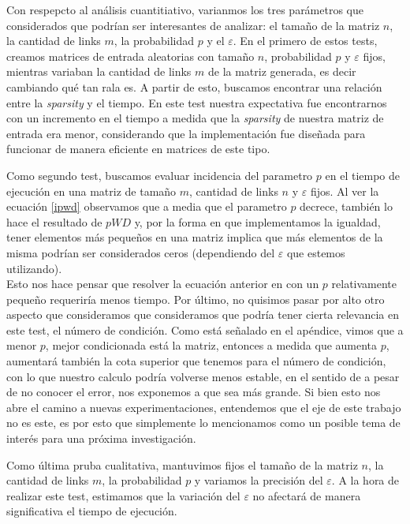 \par 

Con respepcto al an\'alisis cuantitiativo, varianmos los tres par\'ametros que considerados que podr\'ian ser interesantes de analizar:
el tama\~no de la matriz $n$, la cantidad de links $m$, la probabilidad $p$ y el $\varepsilon$.
\newline
En el primero de estos tests, creamos matrices de entrada aleatorias con tamaño $n$, probabilidad $p$ y $\varepsilon$ fijos, mientras variaban la cantidad de links $m$
de la matriz generada, es decir cambiando qu\'e tan rala es. A partir de esto, buscamos encontrar una relaci\'on entre la \textit{sparsity} y el tiempo.\newline
En este test nuestra expectativa fue encontrarnos con un incremento en el tiempo a medida 
que la \textit{sparsity} de nuestra matriz de entrada era menor, considerando que la
implementaci\'on fue diseñada para funcionar de manera eficiente en matrices de este tipo.

\par
Como segundo test, buscamos evaluar incidencia del parametro $p$ en el tiempo de ejecuci\'on en una matriz de tamaño $m$, cantidad de links $n$ 
y $\varepsilon$ fijos.\newline
Al ver la ecuaci\'on \ref{ipwd} observamos que a media que el parametro $p$ decrece, tambi\'en lo hace el resultado de $pWD$ y, 
por la forma en que implementamos la igualdad, tener elementos m\'as pequeños en una matriz implica que m\'as elementos de la misma podr\'ian 
ser considerados ceros (dependiendo del $\varepsilon$ que estemos utilizando).\\
Esto nos hace pensar que resolver la ecuaci\'on anterior en con un $p$ relativamente pequeño  requerir\'ia menos tiempo.
Por \'ultimo, no quisimos pasar por alto otro aspecto que consideramos que consideramos que podr\'ia tener cierta relevancia en este test, el n\'umero de condici\'on. 
Como est\'a señalado en el ap\'endice, vimos que a menor $p$, mejor condicionada est\'a la matriz, entonces a medida que aumenta $p$, 
aumentar\'a tambi\'en la cota superior que tenemos para el n\'umero de condici\'on, con lo que nuestro calculo podr\'ia volverse menos estable, 
en el sentido de a pesar de no conocer el error, nos exponemos a que sea m\'as grande.
Si bien esto nos abre el camino a nuevas experimentaciones, entendemos que el eje de este trabajo no es este, es por esto que simplemente lo mencionamos como un posible tema de inter\'es para una pr\'oxima investigaci\'on.

\par
Como \'ultima pruba cualitativa, mantuvimos fijos el tama\~no de la matriz $n$, la cantidad de links $m$, la probabilidad $p$ y variamos la precisi\'on del $\varepsilon$.
A la hora de realizar este test, estimamos que la variaci\'on del $\varepsilon$ no afectar\'a de manera significativa el tiempo de ejecuci\'on.